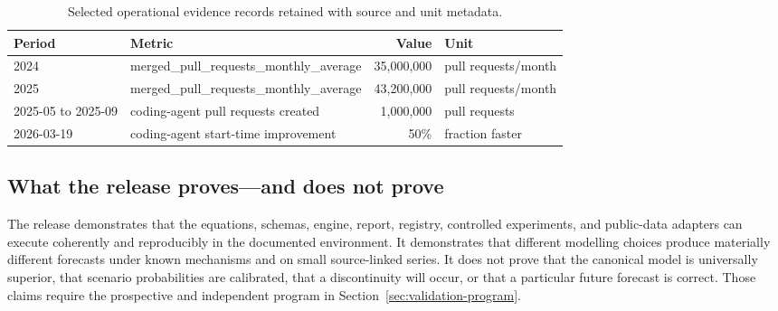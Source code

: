 \begin{table}[H]
\centering
\caption{Selected operational evidence records retained with source and unit metadata.}
\begin{tabular}{p{}p{}rp{}}
\toprule
\textbf{Period} & \textbf{Metric} & \textbf{Value} & \textbf{Unit}\\
\midrule
2024 & merged\_pull\_requests\_monthly\_average & 35,000,000 & pull requests/month \\
2025 & merged\_pull\_requests\_monthly\_average & 43,200,000 & pull requests/month \\
2025-05 to 2025-09 & coding-agent pull requests created & 1,000,000 & pull requests \\
2026-03-19 & coding-agent start-time improvement & 50\% & fraction faster \\
\bottomrule
\end{tabular}
\label{tab:github-evidence}
\end{table}

\subsection{What the release proves---and does not prove}

The release demonstrates that the equations, schemas, engine, report, registry, controlled experiments, and public-data adapters can execute coherently and reproducibly in the documented environment. It demonstrates that different modelling choices produce materially different forecasts under known mechanisms and on small source-linked series. It does not prove that the canonical model is universally superior, that scenario probabilities are calibrated, that a discontinuity will occur, or that a particular future forecast is correct. Those claims require the prospective and independent program in Section~\ref{sec:validation-program}.
